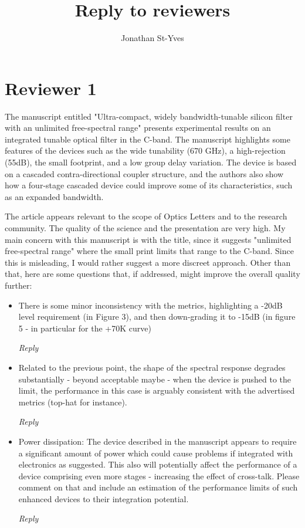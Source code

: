 \documentclass[]{article}
\title{Reply to reviewers}
\author{Jonathan St-Yves}
\begin{document}
\maketitle


\section{Reviewer 1}
The manuscript entitled "Ultra-compact, widely bandwidth-tunable silicon filter with an unlimited free-spectral range" presents experimental results on an integrated tunable optical filter in the C-band. The manuscript highlights some features of the devices such as the wide tunability (670 GHz), a high-rejection (55dB), the small footprint, and a low group delay variation.
The device is based on a cascaded contra-directional coupler structure, and the authors also show how a four-stage cascaded device could improve some of its characteristics, such as an expanded bandwidth.

The article appears relevant to the scope of Optics Letters and to the research community. The quality of the science and the presentation are very high.
My main concern with this manuscript is with the title, since it suggests "unlimited free-spectral range" where the small print limits that range to the C-band. Since this is misleading, I would rather suggest a more discreet approach.
Other than that, here are some questions that, if addressed, might improve the overall quality further:
\begin{itemize}
\item There is some minor inconsistency with the metrics, highlighting a -20dB level requirement (in Figure 3), and then down-grading it to -15dB (in figure 5 - in particular for the +70K curve)

\emph{Reply}

\item Related to the previous point, the shape of the spectral response degrades substantially - beyond acceptable maybe - when the device is pushed to the limit, the performance in this case is arguably consistent with the advertised metrics (top-hat for instance).

\emph{Reply}

\item Power dissipation: The device described in the manuscript appears to require a significant amount of power which could cause problems if integrated with electronics as suggested. This also will potentially affect the performance of a device comprising even more stages - increasing the effect of cross-talk. Please comment on that and include an estimation of the performance limits of such enhanced devices to their integration potential.

\emph{Reply}

\end{itemize}
\end{document}
